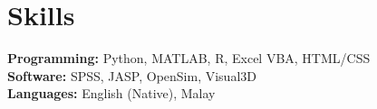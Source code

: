 \documentclass[../main.tex]{subfiles}
\begin{document}
\section{Skills}
  \vspace{2pt}
  \resumeSubHeadingListStart
    {\item{
        \textbf{Programming: }{Python, MATLAB, R, Excel VBA, HTML/CSS} \\ \vspace{2pt}
        \textbf{Software: }{SPSS, JASP, OpenSim, Visual3D} \\ \vspace{2pt}
        \textbf{Languages: }{English (Native), Malay} \\ \vspace{2pt}
        
    }}
  \resumeSubHeadingListEnd
\end{document}
